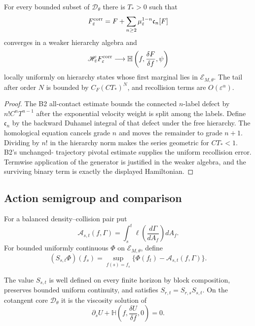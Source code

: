 \begin{theorem}
\label{thm:r5-b4-correctors}
For every bounded subset of \({\mathscr D}_\theta\) there is \(T_*>0\) such
that
\[
 F_\varepsilon^{\rm corr}
 =
 F+\sum_{n\ge2}\mu_\varepsilon^{1-n}{\mathfrak c}_n[F]
\]
converges in a weaker hierarchy algebra and
\[
 {\mathscr H}_\varepsilon F_\varepsilon^{\rm corr}
 \longrightarrow
 {\mathbb H}\left(f,\frac{\delta F}{\delta f},\psi\right)
\]
locally uniformly on hierarchy states whose first marginal lies in
\({\mathcal E}_{M,\theta}\).  The tail after order \(N\) is bounded by
\(C_F(CT_*)^N\), and recollision terms are
\(O(\varepsilon^\alpha)\).
\end{theorem}

\begin{proof}
The B2 all-contact estimate bounds the connected \(n\)-label defect by
\(n!C^nT^{n-1}\) after the exponential velocity weight is split among the
labels.  Define \({\mathfrak c}_n\) by the backward Duhamel integral of that
defect under the free hierarchy.  The homological equation cancels grade
\(n\) and moves the remainder to grade \(n+1\).  Dividing by \(n!\) in the
hierarchy norm makes the series geometric for \(CT_*<1\).  B2's unchanged-
trajectory pivotal estimate supplies the uniform recollision error.
Termwise application of the generator is justified in the weaker algebra,
and the surviving binary term is exactly the displayed Hamiltonian.
\end{proof}

\subsection{Action semigroup and comparison}

For a balanced density--collision pair put
\[
 {\mathcal A}_{s,t}(f,\Gamma)
 =
 \int_s^t
 \ell\left(\frac{d\Gamma}{dA_f}\right)dA_f.
\]
For bounded uniformly continuous \(\Phi\) on
\({\mathcal E}_{M,\theta}\), define
\[
 (S_{s,t}\Phi)(f_s)
 =
 \sup_{f(s)=f_s}
 \{\Phi(f_t)-{\mathcal A}_{s,t}(f,\Gamma)\}.
\]

\begin{theorem}
\label{thm:r5-b4-action}
The value \(S_{s,t}\) is well defined on every finite horizon by block
composition, preserves bounded uniform continuity, and satisfies
\(S_{r,t}=S_{r,s}S_{s,t}\).  On the cotangent core
\({\mathscr D}_\theta\) it is the viscosity solution of
\[
 \partial_sU+
 {\mathbb H}\left(f,\frac{\delta U}{\delta f},0\right)=0.
\]
\end{theorem}

